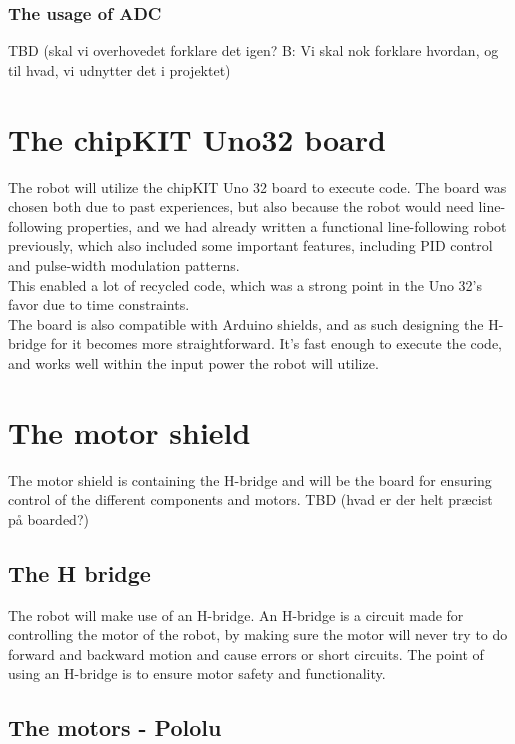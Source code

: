 

\subsubsection{The usage of ADC}
TBD (skal vi overhovedet forklare det igen? B: Vi skal nok forklare hvordan, og til hvad, vi udnytter det i projektet)

\section{The chipKIT Uno32 board}
The robot will utilize the chipKIT Uno 32 board to execute code. The board
was chosen both due to past experiences, but also because the robot would need
line-following properties, and we had already written a functional line-following robot
previously, which also included some important features, including PID control and 
pulse-width modulation patterns. \\
This enabled a lot of recycled code, which was a strong point
in the Uno 32's favor due to time constraints. \\

The board is also compatible with Arduino shields, and as such designing the H-bridge for it
becomes more straightforward. It's fast enough to execute the code, and works well within the
input power the robot will utilize.

\section{The motor shield}
The motor shield is containing the H-bridge and will be the board for ensuring control of the different components and motors.
TBD (hvad er der helt præcist på boarded?)

\subsection{The H bridge}
The robot will make use of an H-bridge. An H-bridge is a circuit made for controlling the motor of the robot, by making sure the motor will never try to do forward and backward motion  and cause errors or short circuits. The point of using an H-bridge is to ensure motor safety and functionality.

\subsection{The motors - Pololu}

